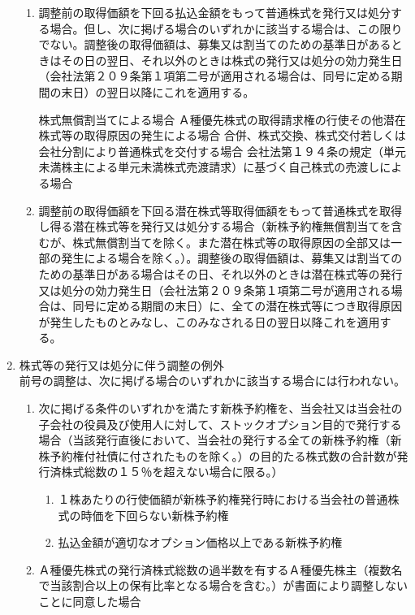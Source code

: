 \documentclass[10pt,a4paper,uplatex]{jsarticle}
\begin{document}
\begin{enumerate}
    \begin{enumerate}
      \item 調整前の取得価額を下回る払込金額をもって普通株式を発行又は処分する場合。但し、次に掲げる場合のいずれかに該当する場合は、この限りでない。調整後の取得価額は、募集又は割当てのための基準日があるときはその日の翌日、それ以外のときは株式の発行又は処分の効力発生日（会社法第２０９条第１項第二号が適用される場合は、同号に定める期間の末日）の翌日以降にこれを適用する。
      \begin{enumerate}
        \itm 株式無償割当てによる場合
        \itm Ａ種優先株式の取得請求権の行使その他潜在株式等の取得原因の発生による場合
        \itm 合併、株式交換、株式交付若しくは会社分割により普通株式を交付する場合
        \itm 会社法第１９４条の規定（単元未満株主による単元未満株式売渡請求）に基づく自己株式の売渡しによる場合
      \end{enumerate}
      \item 調整前の取得価額を下回る潜在株式等取得価額をもって普通株式を取得し得る潜在株式等を発行又は処分する場合（新株予約権無償割当てを含むが、株式無償割当てを除く。また潜在株式等の取得原因の全部又は一部の発生による場合を除く。）。調整後の取得価額は、募集又は割当てのための基準日がある場合はその日、それ以外のときは潜在株式等の発行又は処分の効力発生日（会社法第２０９条第１項第二号が適用される場合は、同号に定める期間の末日）に、全ての潜在株式等につき取得原因が発生したものとみなし、このみなされる日の翌日以降これを適用する。
    \end{enumerate}


  \item 株式等の発行又は処分に伴う調整の例外\\
    前号の調整は、次に掲げる場合のいずれかに該当する場合には行われない。
    \begin{enumerate}
      \item 次に掲げる条件のいずれかを満たす新株予約権を、当会社又は当会社の子会社の役員及び使用人に対して、ストックオプション目的で発行する場合（当該発行直後において、当会社の発行する全ての新株予約権（新株予約権付社債に付されたものを除く。）の目的たる株式数の合計数が発行済株式総数の１５％を超えない場合に限る。）
        \begin{enumerate}
          \item １株あたりの行使価額が新株予約権発行時における当会社の普通株式の時価を下回らない新株予約権
          \item 払込金額が適切なオプション価格以上である新株予約権
        \end{enumerate}
      \item Ａ種優先株式の発行済株式総数の過半数を有するＡ種優先株主（複数名で当該割合以上の保有比率となる場合を含む。）が書面により調整しないことに同意した場合
    \end{enumerate}


\end{enumerate}
\end{document}
